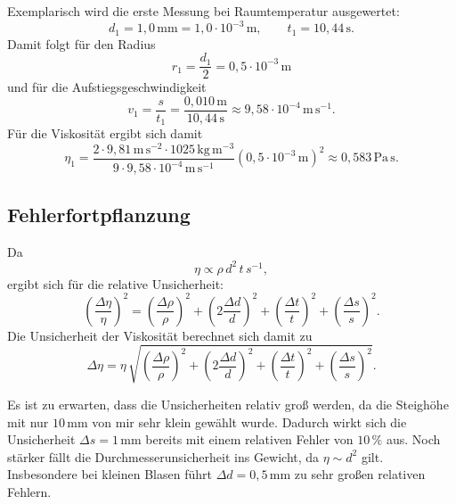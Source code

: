 \documentclass{report}
\begin{document}
Exemplarisch wird die erste Messung bei Raumtemperatur ausgewertet:
\begin{equation}
    d_1 = 1{,}0\,\mathrm{mm} = 1{,}0 \cdot 10^{-3}\,\mathrm{m},
    \qquad
    t_1 = 10{,}44\,\mathrm{s}.
\end{equation}
Damit folgt für den Radius
\begin{equation}
    r_1 = \frac{d_1}{2} = 0{,}5 \cdot 10^{-3}\,\mathrm{m}
\end{equation}
und für die Aufstiegsgeschwindigkeit
\begin{equation}
    v_1 = \frac{s}{t_1}
        = \frac{0{,}010\,\mathrm{m}}{10{,}44\,\mathrm{s}}
        \approx 9{,}58 \cdot 10^{-4}\,\mathrm{m\,s^{-1}}.
\end{equation}
Für die Viskosität ergibt sich damit
\begin{equation}
    \eta_1
    = \frac{2 \cdot 9{,}81\,\mathrm{m\,s^{-2}} \cdot 1025\,\mathrm{kg\,m^{-3}}}{9 \cdot 9{,}58 \cdot 10^{-4}\,\mathrm{m\,s^{-1}}}
      \left(0{,}5 \cdot 10^{-3}\,\mathrm{m}\right)^2
    \approx 0{,}583\,\mathrm{Pa\,s}.
\end{equation}

\subsection{Fehlerfortpflanzung}

Da
\begin{equation}
    \eta \propto \rho \, d^2 \, t \, s^{-1},
\end{equation}
ergibt sich für die relative Unsicherheit:
\begin{equation}
    \left(\frac{\Delta \eta}{\eta}\right)^2
    =
    \left(\frac{\Delta \rho}{\rho}\right)^2
    +
    \left(2\frac{\Delta d}{d}\right)^2
    +
    \left(\frac{\Delta t}{t}\right)^2
    +
    \left(\frac{\Delta s}{s}\right)^2.
\end{equation}
Die Unsicherheit der Viskosität berechnet sich damit zu
\begin{equation}
    \Delta \eta
    =
    \eta \,
    \sqrt{
    \left(\frac{\Delta \rho}{\rho}\right)^2
    +
    \left(2\frac{\Delta d}{d}\right)^2
    +
    \left(\frac{\Delta t}{t}\right)^2
    +
    \left(\frac{\Delta s}{s}\right)^2 }.
\end{equation}

\noindent
Es ist zu erwarten, dass die Unsicherheiten relativ groß werden, da die Steighöhe mit
nur $10\,\mathrm{mm}$ von mir sehr klein gewählt wurde. Dadurch wirkt sich die Unsicherheit
$\Delta s = 1\,\mathrm{mm}$ bereits mit einem relativen Fehler von $10\,\%$ aus.
Noch stärker fällt die Durchmesserunsicherheit ins Gewicht, da $\eta \sim d^2$ gilt.
Insbesondere bei kleinen Blasen führt $\Delta d = 0{,}5\,\mathrm{mm}$ zu sehr großen
relativen Fehlern.
\end{document}
